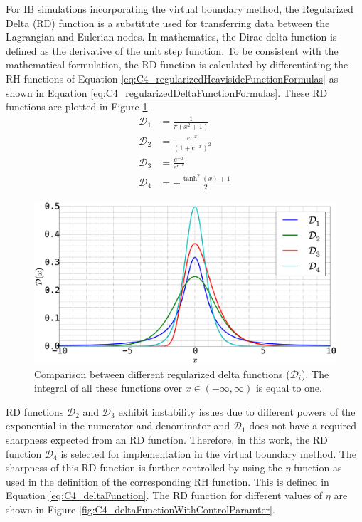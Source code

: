 For IB simulations incorporating the virtual boundary method, the Regularized Delta (RD) function is a substitute used for transferring data between the Lagrangian and Eulerian nodes. In mathematics, the Dirac delta function is defined as the derivative of the unit step function. To be consistent with the mathematical formulation, the RD function is calculated by differentiating the RH functions of Equation \eqref{eq:C4_regularizedHeavisideFunctionFormulas} as shown in Equation \eqref{eq:C4_regularizedDeltaFunctionFormulas}. These RD functions are plotted in Figure \ref{fig:C4_deltaFunctionExample}.
%
\begin{subequations}\label{eq:C4_regularizedDeltaFunctionFormulas}
\begin{align}
    \mathcal{D}_1 &= \frac{1}{\pi \left(x^{2} + 1\right)} \\
    \mathcal{D}_2 &= \frac{e^{- x}}{\left(1 + e^{- x}\right)^{2}} \\
    \mathcal{D}_3 &= \frac{e^{- x}}{e^{e^{- x}}} \\
    \mathcal{D}_4 &= - \frac{\tanh^{2}{\left (x \right )} + 1}{2}
\end{align}
\end{subequations}
%
%
\begin{figure}[H]
    \centering
    \includegraphics[width=12.00cm]{Chapter_4/figure/delta_function_example.eps}
    \caption{Comparison between different regularized delta functions ($\mathcal{D}_i$). The integral of all these functions over $x\in(-\infty, \infty)$ is equal to one.}
    \label{fig:C4_deltaFunctionExample}
\end{figure}
%
RD functions $\mathcal{D}_2$ and $\mathcal{D}_3$ exhibit instability issues due to different powers of the exponential in the numerator and denominator and $\mathcal{D}_1$ does not have a required sharpness expected from an RD function. Therefore, in this work, the RD function $\mathcal{D}_4$ is selected for implementation in the virtual boundary method. The sharpness of this RD function is further controlled by using the $\eta$ function as used in the definition of the corresponding RH function. This is defined in Equation \eqref{eq:C4_deltaFunction}. The RD function for different values of $\eta$ are shown in Figure \ref{fig:C4_deltaFunctionWithControlParamter}.
